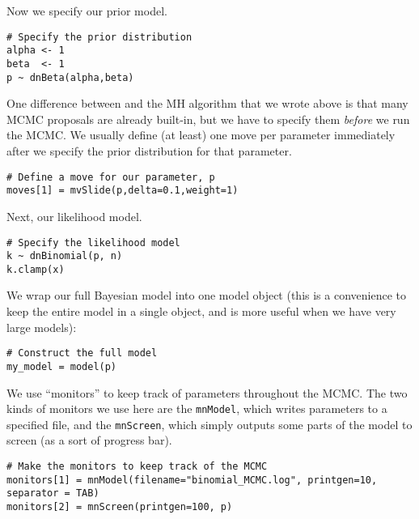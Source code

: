 Now we specify our prior model.
{\tt \begin{snugshade*}
\begin{lstlisting}    
# Specify the prior distribution
alpha <- 1
beta  <- 1
p ~ dnBeta(alpha,beta)
\end{lstlisting}
\end{snugshade*}}

One difference between \RevBayes and the MH algorithm that we wrote above is that many MCMC proposals are already built-in, but we have to specify them \emph{before} we run the MCMC.
We usually define (at least) one move per parameter immediately after we specify the prior distribution for that parameter.

{\tt \begin{snugshade*}
\begin{lstlisting}    
# Define a move for our parameter, p
moves[1] = mvSlide(p,delta=0.1,weight=1)
\end{lstlisting}
\end{snugshade*}}

Next, our likelihood model.
{\tt \begin{snugshade*}
\begin{lstlisting}    
# Specify the likelihood model
k ~ dnBinomial(p, n)
k.clamp(x)
\end{lstlisting}
\end{snugshade*}}

We wrap our full Bayesian model into one model object (this is a convenience to keep the entire model in a single object, and is more useful when we have very large models):
{\tt \begin{snugshade*}
\begin{lstlisting}    
# Construct the full model
my_model = model(p)
\end{lstlisting}
\end{snugshade*}}

We use ``monitors'' to keep track of parameters throughout the MCMC.
The two kinds of monitors we use here are the \texttt{mnModel}, which writes parameters to a specified file, and the \texttt{mnScreen}, which simply outputs some parts of the model to screen (as a sort of progress bar).
{\tt \begin{snugshade*}
\begin{lstlisting}    
# Make the monitors to keep track of the MCMC
monitors[1] = mnModel(filename="binomial_MCMC.log", printgen=10, separator = TAB)
monitors[2] = mnScreen(printgen=100, p)
\end{lstlisting}
\end{snugshade*}}

